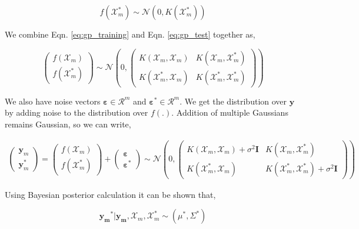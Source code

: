 \documentclass[english]{tktltiki}
\begin{document}
\begin{equation}
f(\mathcal{X}_m^*) \sim \mathcal{N} (0, K(\mathcal{X}_m^*))
\label{eq:gp_test}
\end{equation}

We combine Eqn. \ref{eq:gp_training} and Eqn. \ref{eq:gp_test} together as,

\begin{equation}
\begin{pmatrix}
f(\mathcal{X}_m) \\
f(\mathcal{X}_m^*)
\end{pmatrix}
\sim \mathcal{N} \left( %
0, %
\begin{pmatrix}
K(\mathcal{X}_m, \mathcal{X}_m) & K(\mathcal{X}_m, \mathcal{X}_m^*) \\
K(\mathcal{X}_m^*, \mathcal{X}_m) & K(\mathcal{X}_m^*, \mathcal{X}_m^*)
\end{pmatrix}\right)
\end{equation}

We also have noise vectors $\mathbf{\varepsilon} \in \mathcal{R}^m$ and $\mathbf{\varepsilon^*} \in \mathcal{R}^m$. We get the distribution over $\mathbf{y}$ by adding noise to the distribution over $f(.)$. Addition of multiple Gaussians remains Gaussian, so we can write,

\begin{eqnarray}
\begin{pmatrix}
\mathbf{y}_m \\
\mathbf{y}_m^*
\end{pmatrix}
= %
\begin{pmatrix}
f(\mathcal{X}_m) \\
f(\mathcal{X}_m^*)
\end{pmatrix}
+%
\begin{pmatrix}
\mathbf{\varepsilon} \\
\mathbf{\varepsilon^*}
\end{pmatrix}
\sim \mathcal{N} \left( %
0, %
\begin{pmatrix}
K(\mathcal{X}_m, \mathcal{X}_m) + \sigma^2 \mathbf{I} & K(\mathcal{X}_m, \mathcal{X}_m^*) \\
K(\mathcal{X}_m^*, \mathcal{X}_m) & K(\mathcal{X}_m^*, \mathcal{X}_m^*) + \sigma^2 \mathbf{I}
\end{pmatrix}\right)
\end{eqnarray}

Using Bayesian posterior calculation it can be shown that,

\begin{equation}
\mathbf{y_m}^* | \mathbf{y_m}, \mathcal{X}_m, \mathcal{X}_m^* \sim (\mu^*, \Sigma^*)
\end{equation}
\end{document}
